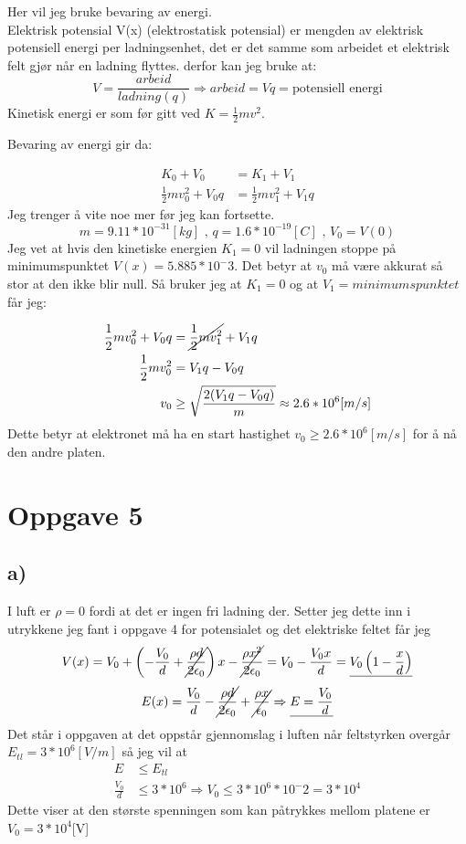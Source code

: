\documentclass[a4paper,12pt,norsk]{article}
\begin{document}
Her vil jeg bruke bevaring av energi. \\
Elektrisk potensial V(x) (elektrostatisk potensial) er mengden av elektrisk potensiell energi per ladningsenhet, det er det samme som arbeidet et elektrisk felt gjør når en ladning flyttes. derfor kan jeg bruke at: $$V = \frac{arbeid}{ladning(q)} \Rightarrow arbeid = Vq = \text{potensiell energi}$$  Kinetisk energi er som før gitt ved $K = \frac{1}{2}mv^2$. 

Bevaring av energi gir da:

\begin{align*}
K_0 + V_0 &= K_1 + V_1\\
\frac{1}{2}mv_0^2 + V_0q &= \frac{1}{2}mv_1^2 + V_1q
\end{align*}
Jeg trenger å vite noe mer før jeg kan fortsette.
$$m = 9.11*10^{-31} [kg] \text{ , } q = 1.6*10^{-19}[C] \text{ , }V_0 =V(0)$$
Jeg vet at hvis den kinetiske energien $K_1 = 0$ vil ladningen stoppe på minimumspunktet $V(x) =5.885*10^-3$. Det betyr at $v_0$ må være akkurat så stor at den ikke blir null. Så bruker jeg at $K_1 = 0$ og at $V_1 = minimumspunktet$ får jeg:

\begin{align*}
\frac{1}{2}mv_0^2 + V_0q &= \cancel{\frac{1}{2}mv_1^2 }+ V_1q\\
\frac{1}{2}mv_0^2 &= V_1q-V_0q\\
v_0 &\geq \sqrt{\frac{2(V_1q-V_0q)}{m}} \approx 2.6*10^6 [m/s] 
\end{align*}
Dette betyr at elektronet må ha en start hastighet $v_0\geq2.6*10^6 [m/ s]$ for å nå den andre platen.

\section{Oppgave 5}

\subsection{a)}
I luft er $\rho = 0$ fordi at det er ingen fri ladning der. Setter jeg dette inn i utrykkene jeg fant i oppgave 4 for potensialet og det elektriske feltet får jeg 
$$V(x) =V_0 + \left( -\frac{V_0}{d} + \cancel{\frac{\rho d}{2\epsilon_0}} \right)x - \cancel{\frac{\rho x^2}{2\epsilon_0}} = V_0 -\frac{V_0x}{d} = \underline{V_0\left( 1- \frac{x}{d}\right)}$$
$$E(x) = \frac{V_0}{d} - \cancel{\frac{\rho d}{2\epsilon_0}} + \cancel{\frac{\rho x}{\epsilon_0}} \Rightarrow \underline{E = \frac{V_0}{d}} $$
Det står i oppgaven at det oppstår gjennomslag i luften når feltstyrken overgår $E_{tl} = 3*10^6 [V/m]$ så jeg vil at 
\begin{align*}
E &\leq  E_{tl}\\
 \frac{V_0}{d} &\leq 3*10^6 \Rightarrow V_0 \leq 3*10^6 *10^-2 = 3*10^4
\end{align*}
Dette viser at den største spenningen som kan påtrykkes mellom platene er $V_0 = 3*10^4$[V]
\end{document}
